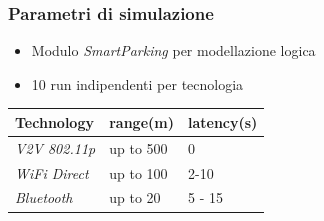 \documentclass{beamer}
\begin{document}
\begin{frame}
\frametitle{Parametri di simulazione}
\begin{itemize}
\item Modulo \textit{SmartParking} per modellazione logica
\item 10 run indipendenti per tecnologia
\end{itemize}
\begin{table}
\begin{tabular}{l l l}
\toprule
\textbf{Technology} & \textbf{range(m)} & \textbf{latency(s)}\\
\midrule
\textit{V2V 802.11p} & up to 500 & 0 \\
\textit{WiFi Direct} & up to 100 & 2-10 \\
\textit{Bluetooth}  & up to 20 & 5 - 15 \\
\bottomrule
\end{tabular}
\end{table}
\end{frame}
\end{document}
